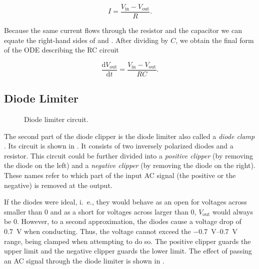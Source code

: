 \begin{equation}
  I = \frac{V_\text{in} - V_\text{out}}{R}.
  \label{eq:current_through_resistor}
\end{equation}

Because the same current flows through the resistor and the capacitor we can equate the right-hand sides of  and . After dividing by $C$, we obtain the final form of the \ac{ODE} describing the RC circuit

\begin{equation}
  \frac{\mathrm{d}V_\text{out}}{\mathrm{d} t} = \frac{V_\text{in} - V_\text{out}}{RC}.
\end{equation}



\subsection*{Diode Limiter}
\begin{figure}
  \centering
  
  \caption{Diode limiter circuit.}
  \label{fig:diode_limiter}
\end{figure}

The second part of the diode clipper is the diode limiter also called a \emph{diode clamp} \cite{Malvino2016}. Its circuit is shown in . It consists of two inversely polarized diodes and a resistor. This circuit could be further divided into a \emph{positive clipper} (by removing the diode on the left) and a \emph{negative clipper} (by removing the diode on the right). These names refer to which part of the input \ac{AC} signal (the positive or the negative) is removed at the output.

If the diodes were ideal, i.\ e., they would behave as an open for voltages across smaller than 0 and as a short for voltages across larger than 0, $V_\text{out}$ would always be 0. However, to a second approximation, the diodes cause a voltage drop of \SI{0.7}{V} when conducting. Thus, the voltage cannot exceed the \SIrange{-0.7}{0.7}{V} range, being clamped when attempting to do so. The positive clipper guards the upper limit and the negative clipper guards the lower limit. The effect of passing an \ac{AC} signal through the diode limiter is shown in .

